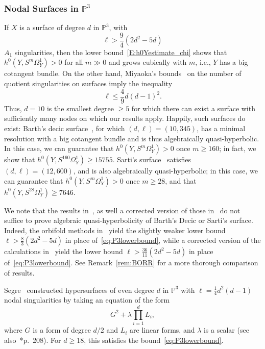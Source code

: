 \documentclass[12pt, reqno]{amsart}
\theoremstyle{definition}
\newcommand{\PP}{{\mathbb P}}
\numberwithin{equation}{section}
\numberwithin{table}{section}
\begin{document}
\subsubsection{Nodal Surfaces in $\PP^3$}
If $X$ is a surface of degree $d$ in $\PP^3$, with 
\begin{equation}
\label{eq:P3lowerbound}
\ell > \frac{9}{4}(2d^2 - 5d)
\end{equation}
$A_1$ singularities, then the lower bound~\eqref{E:h0Yestimate_chi} shows that $h^0(Y,S^m\Omega^1_Y) > 0$ for all $m \gg 0$ and grows cubically with $m$, i.e., $Y$ has a big cotangent bundle.  On the other hand, Miyaoka's bounds~\cite[\S2.3]{MiyaokaBounds} on the number of quotient singularities on surfaces imply the inequality 
\[
\ell \leq \frac{4}{9}d(d-1)^2.
\]
Thus, $d = 10$ is the smallest degree $\geq 5$ for which there can exist a surface with sufficiently many nodes on which our results apply. Happily, such surfaces do exist: Barth's decic surface~\cite{Barth1996}, for which $(d,\ell) = (10,345)$, has a minimal resolution with a big cotangent bundle and is thus algebraically quasi-hyperbolic.  In this case, we can guarantee that $h^0(Y,S^m\Omega^1_Y) > 0$ once $m\geq 160$; in fact, we show that $h^0(Y,S^{160}\Omega^1_Y) \geq 15755$.  Sarti's surface~\cite{Sarti2001} satisfies $(d,\ell) = (12,600)$, and is also algebraically quasi-hyperbolic; in this case, we can guarantee that  $h^0(Y,S^m\Omega^1_Y) > 0$ once $m\geq 28$, and that $h^0(Y,S^{28}\Omega^1_Y)\geq 7646$.

We note that the results in~\cite{RoulleauRousseau}, as well a corrected version of those in~\cite{BO} do not suffice to prove algebraic quasi-hyperbolicity of Barth's Decic or Sarti's surface. Indeed, the orbifold methods in~\cite{RoulleauRousseau} yield the slightly weaker lower bound $\ell > \frac{8}{3} (2d^2-5d)$ in place of~\eqref{eq:P3lowerbound}, while a corrected version of the calculations in~\cite{BO} yield the lower bound $\ell > \frac{36}{11}(2d^2-5d)$ in place of~\eqref{eq:P3lowerbound}. See Remark~\ref{rem:BORR} for a more thorough comparison of results.

Segre~\cite{Segre1947} constructed hypersurfaces of even degree $d$ in $\PP^3$ with $\ell=\frac{1}{4}d^2(d-1)$ nodal singularities by taking an equation of the form
\[G^2+\lambda\prod_{i=1}^dL_i,\]
where $G$ is a form of degree $d/2$ and $L_i$ are linear forms, and $\lambda$ is a scalar (see also~\cite{Beauville1980}*{p.~208}). For $d\geq 18$, this satisfies the bound~\eqref{eq:P3lowerbound}.
\end{document}

